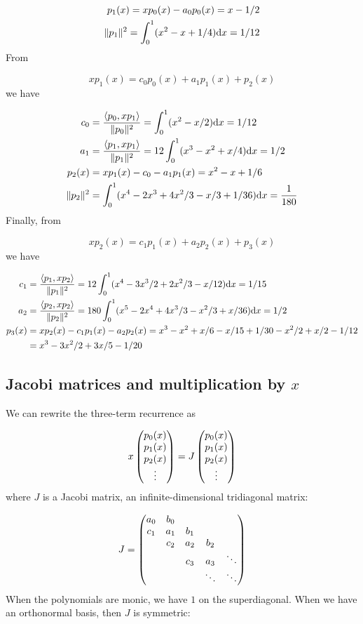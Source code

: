 \documentclass[12pt,a4paper]{article}
\begin{document}
\begin{align*}
p_1(x) = x p_0(x) - a_0 p_0(x) = x-1/2 \\
\|p_1\|^2 = \ensuremath{\int}_0^1 (x^2 - x + 1/4) {\rm d} x = 1/12
\end{align*}
From

\[
x p_1(x) = c_0 p_0(x) + a_1 p_1(x) +  p_2(x)
\]
we have


\begin{align*}
c_0 &= {\ensuremath{\langle}p_0,x p_1\ensuremath{\rangle}  \over \|p_0\|^2} = \ensuremath{\int}_0^1 (x^2 - x/2) {\rm d} x = 1/12 \\
a_1 &= {\ensuremath{\langle}p_1,x p_1\ensuremath{\rangle}  \over \|p_1\|^2} = 12 \ensuremath{\int}_0^1 (x^3 - x^2 + x/4) {\rm d} x = 1/2 \\
p_2(x) &= x p_1(x) - c_0 - a_1 p_1(x) = x^2 - x + 1/6 \\
\|p_2\|^2 &= \int_0^1 (x^4 - 2x^3 + 4x^2/3 - x/3 + 1/36) {\rm d} x = {1 \over 180}
\end{align*}
Finally, from

\[
x p_2(x) = c_1 p_1(x) + a_2 p_2(x) +  p_3(x)
\]
we have


\begin{align*}
c_1 &= {\ensuremath{\langle}p_1,x p_2\ensuremath{\rangle}  \over \|p_1\|^2} = 12 \ensuremath{\int}_0^1 (x^4 - 3x^3/2 +2x^2/3 -x/12)  {\rm d} x = 1/15 \\
a_2 &= {\ensuremath{\langle}p_2,x p_2\ensuremath{\rangle}  \over \|p_2\|^2} = 180 \ensuremath{\int}_0^1 (x^5 - 2x^4 +4x^3/3 - x^2/3 + x/36) {\rm d} x = 1/2 \\
p_3(x) &= x p_2(x) - c_1 p_1(x)- a_2 p_2(x) = x^3 - x^2 + x/6 - x/15 + 1/30 -x^2/2 + x/2 - 1/12 \\
&= x^3 - 3x^2/2 + 3x/5 -1/20
\end{align*}
\subsection{Jacobi matrices and multiplication by $x$}
We can rewrite the three-term recurrence as

\[
x \begin{pmatrix} p_0(x) \cr p_1(x) \cr p_2(x) \cr \vdots \end{pmatrix} = J\begin{pmatrix} p_0(x) \cr p_1(x) \cr p_2(x) \cr \vdots \end{pmatrix}
\]
where $J$ is a Jacobi matrix, an infinite-dimensional tridiagonal matrix:

\[
J = \begin{pmatrix}
a_0 & b_0 \cr
c_1 & a_1 & b_1 \cr
& c_2 & a_2 & b_2 \cr
&& c_3 & a_3 & \ddots \cr
&&&\ddots & \ddots
\end{pmatrix}
\]
When the polynomials are monic, we have $1$ on the superdiagonal.  When we have an orthonormal basis, then $J$ is symmetric:
\end{document}
